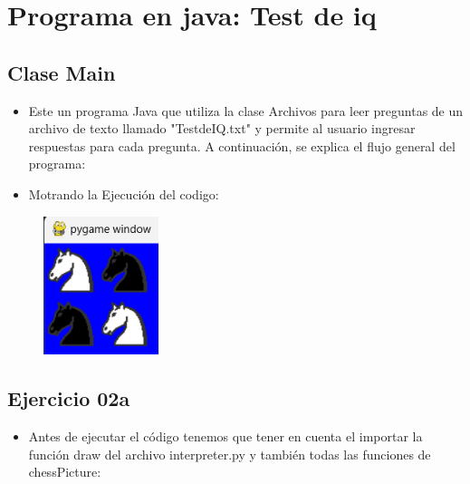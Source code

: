 \documentclass{article}
\begin{document}
	\section{Programa en java: Test de iq}

	\subsection{Clase Main}
	\begin{itemize}	
		\item Este un programa Java que utiliza la clase Archivos para leer preguntas de un archivo de texto llamado "TestdeIQ.txt" y permite al usuario ingresar respuestas para cada pregunta. A continuación, se explica el flujo general del programa:
	\end{itemize}	
	
		

	\begin{itemize}	
		\item Motrando la Ejecución del codigo:
	\end{itemize}	
	
	\begin{figure}[H]
		\centering
		\includegraphics[width=0.3\textwidth,keepaspectratio]{img/Ejercicio2a.png}
	\end{figure}

	\subsection{Ejercicio 02a}
	\begin{itemize}	
		\item Antes de ejecutar el código tenemos que tener en cuenta el importar la función draw del archivo interpreter.py y también todas las funciones de chessPicture:
	\end{itemize}	
	
\end{document}
